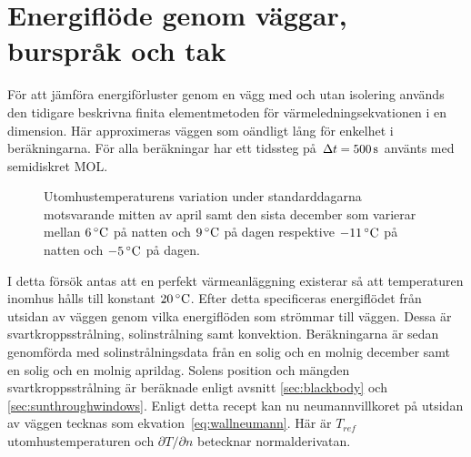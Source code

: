 \section{Energiflöde genom väggar, burspråk och tak}

För att jämföra energiförluster genom en vägg med och utan isolering används
den tidigare beskrivna finita elementmetoden för värmeledningsekvationen i en dimension. Här approximeras
väggen som oändligt lång för enkelhet i beräkningarna. För alla beräkningar har ett tidssteg
på $\Delta t = \unit[500]{s}$ använts med semidiskret MOL.

\begin{figure}[hpbt]
\centering

\vspace{1cm}

\caption{\label{fig:temperaturedist} Utomhustemperaturens variation under standarddagarna motsvarande mitten av april samt den sista december som varierar mellan $\unit[6]{^\circ C}$ på natten och $\unit[9]{^\circ C}$ på dagen respektive $\unit[-11]{^\circ C}$ på natten och $\unit[-5]{^\circ C}$ på dagen.
}
\end{figure}

I detta försök antas att en perfekt värmeanläggning
existerar så att temperaturen inomhus hålls till konstant $\unit[20]{^\circ C}$. Efter detta specificeras energiflödet
från utsidan av väggen genom vilka energiflöden som strömmar till väggen. Dessa är svartkroppsstrålning, solinstrålning
samt konvektion. Beräkningarna är sedan genomförda med solinstrålningsdata från en solig och en molnig december samt
en solig och en molnig aprildag. Solens position och mängden svartkroppsstrålning är beräknade enligt avsnitt \ref{sec:blackbody} och
\ref{sec:sunthroughwindows}. Enligt detta recept kan nu neumannvillkoret
på utsidan av väggen tecknas som ekvation~\eqref{eq:wallneumann}. Här är $T_{ref}$ utomhustemperaturen
och $\partial T/\partial n$ betecknar normalderivatan.

